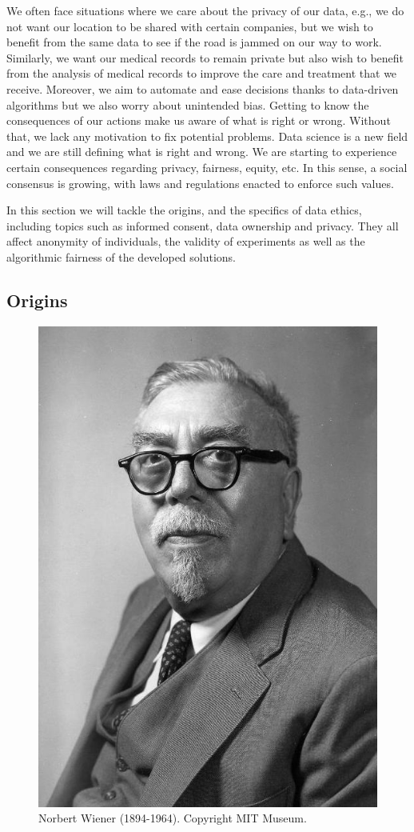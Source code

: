 \documentclass[
]{book}
\begin{document}
We often face situations where we care about the privacy of our data, e.g., we do not want our location to be shared with certain companies, but we wish to benefit from the same data to see if the road is jammed on our way to work. Similarly, we want our medical records to remain private but also wish to benefit from the analysis of medical records to improve the care and treatment that we receive. Moreover, we aim to automate and ease decisions thanks to data-driven algorithms but we also worry about unintended bias. Getting to know the consequences of our actions make us aware of what is right or wrong. Without that, we lack any motivation to fix potential problems. Data science is a new field and we are still defining what is right and wrong. We are starting to experience certain consequences regarding privacy, fairness, equity, etc. In this sense, a social consensus is growing, with laws and regulations enacted to enforce such values.

In this section we will tackle the origins, and the specifics of data ethics, including topics such as informed consent, data ownership and privacy. They all affect anonymity of individuals, the validity of experiments as well as the algorithmic fairness of the developed solutions.

\hypertarget{origins}{%
\subsection{Origins}\label{origins}}

\begin{figure}  
 \begin{center}
    \includegraphics[width=.33\textwidth]{Figures/Norbert Wiener.jpeg}  
  \captionsetup{labelformat=empty}
  \caption{Norbert Wiener (1894-1964). Copyright MIT Museum.} 
\end{center}
\end{figure}
\addtocounter{figure}{-1}
\end{document}
